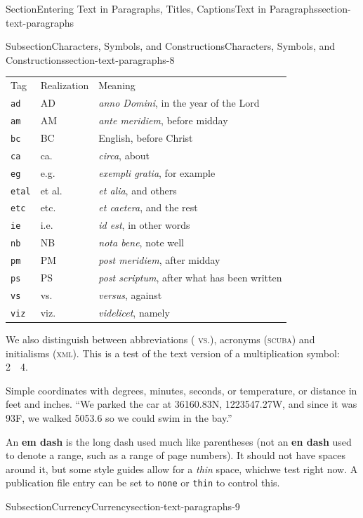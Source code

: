 \documentclass[twoside,10pt,]{article}
\newcommand{\tabularfont}{\relax}
\newcommand{\mono}[1]{\texttt{#1}}
\newcommand{\initialism}[1]{\textsc{\MakeLowercase{#1}}}
\newcommand{\acronym}[1]{\textsc{\MakeLowercase{#1}}}
\newcommand{\abbreviation}[1]{%
\textsc{\MakeLowercase{#1}}}
\newcommand{\terminology}[1]{\textbf{#1}}
\numberwithin{equation}{section}
\begin{document}
\begin{sectionptx}{Section}{Entering Text in Paragraphs, Titles, Captions}{}{Text in Paragraphs}{}{}{section-text-paragraphs}
\begin{subsectionptx}{Subsection}{Characters, Symbols, and Constructions}{}{Characters, Symbols, and Constructions}{}{}{section-text-paragraphs-8}
\begin{center}%
{\tabularfont%
\begin{tabular}{lll}
Tag&Realization&Meaning\tabularnewline[0pt]
\mono{ad}&AD&\textit{anno Domini}, in the year of the Lord\tabularnewline[0pt]
\mono{am}&AM&\textit{ante meridiem}, before midday\tabularnewline[0pt]
\mono{bc}&BC&English, before Christ\tabularnewline[0pt]
\mono{ca}&ca.\@&\textit{circa}, about\tabularnewline[0pt]
\mono{eg}&e.g.\@&\textit{exempli gratia}, for example\tabularnewline[0pt]
\mono{etal}&et al.\@&\textit{et alia}, and others\tabularnewline[0pt]
\mono{etc}&etc.\@&\textit{et caetera}, and the rest\tabularnewline[0pt]
\mono{ie}&i.e.\@&\textit{id est}, in other words\tabularnewline[0pt]
\mono{nb}&NB&\textit{nota bene}, note well\tabularnewline[0pt]
\mono{pm}&PM&\textit{post meridiem}, after midday\tabularnewline[0pt]
\mono{ps}&PS&\textit{post scriptum}, after what has been written\tabularnewline[0pt]
\mono{vs}&vs.\@&\textit{versus}, against\tabularnewline[0pt]
\mono{viz}&viz.\@&\textit{videlicet}, namely
\end{tabular}
}%
\end{center}%
We also distinguish between abbreviations (\abbreviation{vs.}), acronyms (\acronym{SCUBA}) and initialisms (\initialism{XML}).  This is a test of the text version of a multiplication symbol: 2~\texttimes{}~4.%
\par
Simple coordinates with degrees, minutes, seconds, or temperature, or distance in feet and inches.  ``We parked the car at 36\textdegree{}16\textquotesingle{}0.83\textquotesingle\textquotesingle{}N, 122\textdegree{}35\textquotesingle{}47.27\textquotesingle\textquotesingle{}W, and since it was 93\textdegree{}F, we walked 505\textquotesingle{}3.6\textquotesingle\textquotesingle{} so we could swim in the bay.''%
\par
An \terminology{em dash} is the long dash used much like parentheses (not an \terminology{en dash} used to denote a range, such as a range of page numbers).  It should not have spaces around it, but some style guides allow for a \emph{thin} space, which\textemdash{}we test right now.  A publication file entry can be set to \mono{none} or \mono{thin} to control this.%
\end{subsectionptx}
%
%
\typeout{************************************************}
\typeout{************************************************}
%
\begin{subsectionptx}{Subsection}{Currency}{}{Currency}{}{}{section-text-paragraphs-9}

\end{subsectionptx}
\end{sectionptx}
\end{document}
